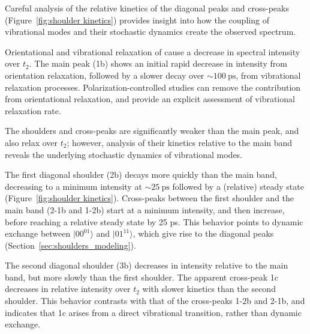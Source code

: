 {Careful analysis of the relative kinetics of the diagonal peaks and cross-peaks (Figure~\ref{fig:shoulder kinetics}) provides insight into how the coupling of  vibrational modes and their stochastic dynamics create the observed spectrum.

Orientational and vibrational relaxation of  cause a decrease in spectral intensity over \(t_2\). The main peak (1b) shows an initial rapid decrease in intensity from orientation relaxation, followed by a slower decay over \(\sim \SI{100}{\ps}\), from vibrational relaxation processes. Polarization-controlled studies can remove the contribution from orientational relaxation, and provide an explicit assessment of vibrational relaxation rate.\cite{hamm_concepts_2011,Hochstrasser2001}

The shoulders and cross-peaks are significantly weaker than the main peak, and also relax over \(t_2\); however, analysis of their kinetics relative to the main band reveals the underlying stochastic dynamics of  vibrational modes.

The first diagonal shoulder (2b) decays more quickly than the main band, decreasing to a minimum intensity at \(\sim \SI{25}{\ps}\) followed by a (relative) steady state (Figure~\ref{fig:shoulder kinetics}). Cross-peaks between the first shoulder and the main band (2-1b and 1-2b) start at a minimum intensity, and then increase, before reaching a relative steady state by 25 ps. This behavior points to dynamic exchange between \(|00^01\rangle\) and \(|01^11\rangle\), which give rise to the diagonal peaks (Section~\ref{sec:shoulders_modeling}).

The second diagonal shoulder (3b) decreases in intensity relative to the main band, but more slowly than the first shoulder. The apparent cross-peak 1c decreases in relative intensity over \(t_2\) with slower kinetics than the second shoulder. This behavior contrasts with that of the cross-peaks 1-2b and 2-1b, and indicates that 1c arises from a direct vibrational transition, rather than dynamic exchange.

}
